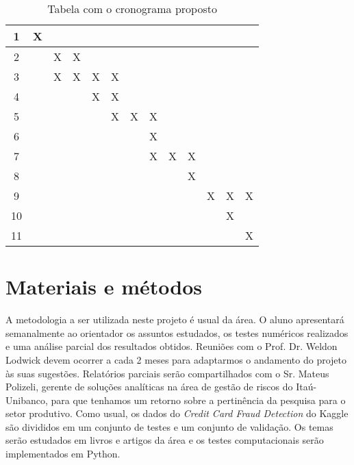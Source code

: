 \documentclass[a4paper,12pt]{article}
\begin{document}
\begin{table}[]
\begin{tabular}{|c|c|c|c|c|c|c|c|c|c|c|c|c|}
1     & X   &     &     &     &     &     &     &     &     &     &     &    \\ \hline
2     &     & X   & X   &     &     &     &     &     &     &     &     &    \\ \hline
3     &     & X   & X   & X   & X   &     &     &     &     &     &     &     \\ \hline
4     &     &     &     & X   & X   &     &     &     &     &     &     &       \\ \hline
5     &     &     &     &     & X   & X   & X   &     &     &     &     &     \\ \hline
6     &     &     &     &     &     &     & X   &     &     &     &     &      \\ \hline
7     &     &     &     &     &     &     & X   & X   & X   &     &     &      \\ \hline
8     &     &     &     &     &     &     &     &     & X   &     &     &      \\ \hline
9     &     &     &     &     &     &     &     &     &     & X   & X   & X     \\ \hline
10    &     &     &     &     &     &     &     &     &     &     & X   &      \\ \hline
11    &     &     &     &     &     &     &     &     &     &     &     & X    \\ \hline
\end{tabular}
\caption{Tabela com o cronograma proposto}
\label{tab:cronograma}
\end{table}


\section{Materiais e métodos}

A metodologia a ser utilizada neste projeto é usual da área. O aluno apresentará semanalmente ao orientador os assuntos estudados, os testes numéricos realizados e uma análise parcial dos resultados obtidos. Reuniões com o Prof. Dr. Weldon Lodwick devem ocorrer a cada 2  meses para adaptarmos o andamento do projeto às suas sugestões. Relatórios parciais serão compartilhados com o Sr. Mateus Polizeli, gerente de soluções analíticas na área de gestão de riscos do Itaú-Unibanco, para que tenhamos  um retorno sobre a pertinência da pesquisa para o setor produtivo. Como usual, os dados  do \textit{Credit Card Fraud Detection} do  Kaggle são divididos em um conjunto de testes e um conjunto de validação. Os temas serão estudados em livros e artigos da área e os testes computacionais serão implementados em Python. 
\end{document}
